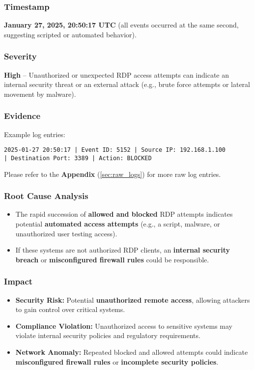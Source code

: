 \documentclass[11pt]{article}
\begin{document}
\subsubsection{Timestamp}
\textbf{January 27, 2025, 20:50:17 UTC} (all events occurred at the same second, suggesting scripted or automated behavior).

\subsubsection{Severity}
\textbf{High} – Unauthorized or unexpected RDP access attempts can indicate an internal security threat or an external attack (e.g., brute force attempts or lateral movement by malware).

\subsubsection{Evidence}
Example log entries:
\begin{verbatim}
2025-01-27 20:50:17 | Event ID: 5152 | Source IP: 192.168.1.100 
| Destination Port: 3389 | Action: BLOCKED  

\end{verbatim}
Please refer to the \textbf{Appendix} (\ref{sec:raw_logs}) for more raw log entries.

\subsubsection{Root Cause Analysis}
\begin{itemize}
    \item The rapid succession of \textbf{allowed and blocked} RDP attempts indicates potential \textbf{automated access attempts} (e.g., a script, malware, or unauthorized user testing access).
    \item If these systems are not authorized RDP clients, an \textbf{internal security breach} or \textbf{misconfigured firewall rules} could be responsible.
\end{itemize}

\subsubsection{Impact}
\begin{itemize}
    \item \textbf{Security Risk:} Potential \textbf{unauthorized remote access}, allowing attackers to gain control over critical systems.
    \item \textbf{Compliance Violation:} Unauthorized access to sensitive systems may violate internal security policies and regulatory requirements.
    \item \textbf{Network Anomaly:} Repeated blocked and allowed attempts could indicate \textbf{misconfigured firewall rules} or \textbf{incomplete security policies}.
\end{itemize}
\end{document}
